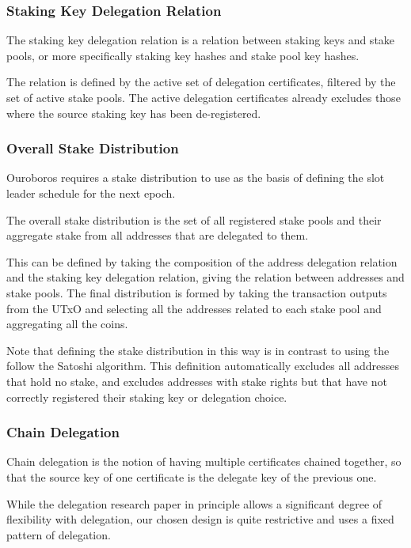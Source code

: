 \documentclass[11pt,a4paper]{article}
\begin{document}
\subsubsection{Staking Key Delegation Relation}
\label{stake-key-delegation-relation}

The staking key delegation relation is a relation between staking keys and
stake pools, or more specifically staking key hashes and stake pool key
hashes.

The relation is defined by the active set of delegation certificates,
filtered by the set of active stake pools. The active delegation
certificates already excludes those where the source staking key has
been de-registered.

\subsubsection{Overall Stake Distribution}
\label{overall-stake-distribution}

Ouroboros \citep{ouroboros_classic} requires a stake distribution to
use as the basis of defining the slot leader schedule for the next
epoch.

The overall stake distribution is the set of all registered stake pools
and their aggregate stake from all addresses that are delegated to them.

This can be defined by taking the composition of the address delegation
relation and the staking key delegation relation, giving the relation
between addresses and stake pools. The final distribution is formed by
taking the transaction outputs from the UTxO and selecting all the
addresses related to each stake pool and aggregating all the coins.

Note that defining the stake distribution in this way is in contrast to
using the follow the Satoshi algorithm. This definition automatically
excludes all addresses that hold no stake, and excludes addresses with
stake rights but that have not correctly registered their staking key or
delegation choice.

\subsubsection{Chain Delegation}
\label{chain-delegation}

Chain delegation is the notion of having multiple certificates chained
together, so that the source key of one certificate is the delegate key
of the previous one.

While the delegation research paper in principle allows a significant
degree of flexibility with delegation, our chosen design is quite
restrictive and uses a fixed pattern of delegation.
\end{document}
